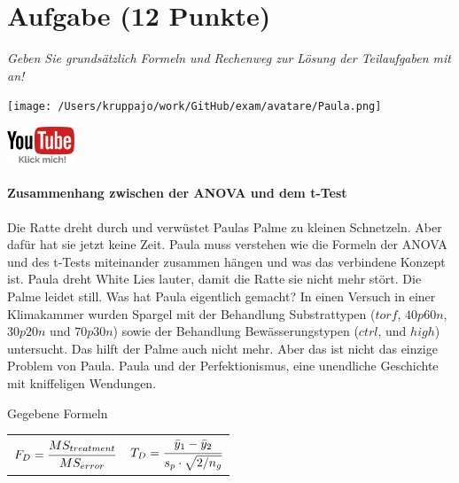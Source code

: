 \documentclass[a4paper, 9pt]{scrartcl}\usepackage[]{graphicx}\usepackage[]{xcolor}
\begin{document}
\clearpage

\section{Aufgabe \hfill (12 Punkte)}

\textit{Geben Sie grundsätzlich Formeln und Rechenweg zur Lösung der Teilaufgaben mit an!} \\[1Ex]
 

 
\begin{minipage}[t]{0.5\textwidth}
\texttt{[image: /Users/kruppajo/work/GitHub/exam/avatare/Paula.png]}
\end{minipage}
\begin{minipage}[t]{0.5\textwidth}
\hfill
\href{https://youtu.be/FjjJXkFJfIY}{\includegraphics[width = 2cm]{img/youtube}}
\end{minipage}
\vspace{-3Ex}



\paragraph{Zusammenhang zwischen der ANOVA und dem t-Test}

Die Ratte dreht durch und verwüstet Paulas Palme zu kleinen Schnetzeln. Aber dafür hat sie jetzt keine Zeit. Paula muss verstehen wie die Formeln der ANOVA und des t-Tests miteinander zusammen hängen und was das verbindene Konzept ist. Paula dreht White Lies lauter, damit die Ratte sie nicht mehr stört. Die Palme leidet still. Was hat Paula eigentlich gemacht? In einen Versuch in einer Klimakammer wurden Spargel mit der Behandlung Substrattypen ($torf$, $40p60n$, $30p20n$ und $70p30n$) sowie der Behandlung Bewässerungstypen ($ctrl$, und $high$) untersucht. Das hilft der Palme auch nicht mehr. Aber das ist nicht das einzige Problem von Paula. Paula und der Perfektionismus, eine unendliche Geschichte mit kniffeligen Wendungen.

\begin{graybox}{Gegebene Formeln}
\begin{center}
  \begin{tabular}{cc}
    $F_{D} = \cfrac{MS_{treatment}}{MS_{error}}$ & $T_{D} = \cfrac{\bar{y}_1 - \bar{y}_2}{s_p \cdot \sqrt{2/n_g}}$\\
  \end{tabular}
\end{center}
\end{graybox}
\end{document}
